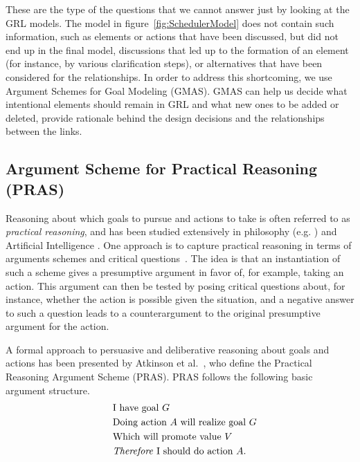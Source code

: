These are the type of the questions that we cannot answer just by looking at the GRL models. The model in figure~\ref{fig:SchedulerModel} does not contain such information, such as elements or actions that have been discussed, but did not end up in the final model, discussions that led up to the formation of an element (for instance, by various clarification steps), or alternatives that have been considered for the relationships. In order to address this shortcoming, we use Argument Schemes for Goal Modeling (GMAS). GMAS can help us decide what intentional elements should remain in GRL and what new ones to be added or deleted, provide rationale behind the design decisions and the relationships between the links. 

\subsection{Argument Scheme for Practical Reasoning (PRAS)}
\label{sect:background:pras}

Reasoning about which goals to pursue and actions to take is often referred to as \emph{practical reasoning}, and has been studied extensively in philosophy (e.g. \cite{Raz1978-RAZPR,walton1990}) and Artificial Intelligence \cite{Bratman1987,atkinson2007}. One approach is to capture practical reasoning in terms of arguments schemes and critical questions~\cite{walton1990}. The idea is that an instantiation of such a scheme gives a presumptive argument in favor of, for example, taking an action. This argument can then be tested by posing critical questions about, for instance, whether the action is possible given the situation, and a negative answer to such a question leads to a counterargument to the original presumptive argument for the action. 

A formal approach to persuasive and deliberative reasoning about goals and actions has been presented by Atkinson et al.~\cite{atkinson2007}, who define the Practical Reasoning Argument Scheme (PRAS). PRAS follows the following basic argument structure. 
\begin{equation}
\label{eq:eq1}
  \begin{aligned}
 \qquad&\text{I have goal } G&\\
&\text{Doing action }A \text{ will realize goal }G&\\
&\text{Which will promote value }V&\\
&\text{\emph{Therefore} I should do action }A.&
  \end{aligned}
\end{equation}


